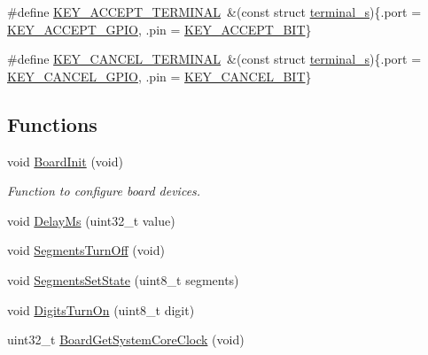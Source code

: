 \begin{DoxyCompactItemize}
\item 
\#define \hyperlink{group__hal_gaf75cad6972c6cb963c517044a838640e}{K\+E\+Y\+\_\+\+A\+C\+C\+E\+P\+T\+\_\+\+T\+E\+R\+M\+I\+N\+AL}~\&(const struct \hyperlink{structterminal__s}{terminal\+\_\+s})\{.port = \hyperlink{group__hal_gaec67cfa1c357906d3146de59945a5af1}{K\+E\+Y\+\_\+\+A\+C\+C\+E\+P\+T\+\_\+\+G\+P\+IO}, .pin = \hyperlink{group__hal_ga099967afffab053d7b61dc41f1806b8d}{K\+E\+Y\+\_\+\+A\+C\+C\+E\+P\+T\+\_\+\+B\+IT}\}
\item 
\#define \hyperlink{group__hal_ga578d1b8afa92612bb447a8ce0d8dcb17}{K\+E\+Y\+\_\+\+C\+A\+N\+C\+E\+L\+\_\+\+T\+E\+R\+M\+I\+N\+AL}~\&(const struct \hyperlink{structterminal__s}{terminal\+\_\+s})\{.port = \hyperlink{group__hal_ga072fd7b6b6eb89b2e4a61425d8b81b09}{K\+E\+Y\+\_\+\+C\+A\+N\+C\+E\+L\+\_\+\+G\+P\+IO}, .pin = \hyperlink{group__hal_ga26ec6a583f60654278e37c9d911d791b}{K\+E\+Y\+\_\+\+C\+A\+N\+C\+E\+L\+\_\+\+B\+IT}\}
\end{DoxyCompactItemize}
\subsection*{Functions}
\begin{DoxyCompactItemize}
\item 
void \hyperlink{group__hal_gad24575a3bcf2c2433e7720830d813e64}{Board\+Init} (void)
\begin{DoxyCompactList}\small\item\em Function to configure board devices. \end{DoxyCompactList}\item 
void \hyperlink{group__hal_gace922d758774792e0573b7c568fe2a3f}{Delay\+Ms} (uint32\+\_\+t value)
\item 
void \hyperlink{group__hal_ga76d9235760f7648a267f3b754ec0abf7}{Segments\+Turn\+Off} (void)
\item 
void \hyperlink{group__hal_gae15c80f1fc4f726afc46735ce5a60877}{Segments\+Set\+State} (uint8\+\_\+t segments)
\item 
void \hyperlink{group__hal_gab32fd447ccc48c0f3b71bcf5f7700d25}{Digits\+Turn\+On} (uint8\+\_\+t digit)
\item 
uint32\+\_\+t \hyperlink{group__hal_ga736805438a3d3b44d06eb01ab1932324}{Board\+Get\+System\+Core\+Clock} (void)
\end{DoxyCompactItemize}
